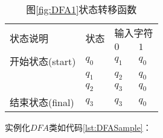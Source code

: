 \begin{table}[!htbp]
    \caption{图{\ref{fig:DFA1}}状态转移函数}
    \label{tab:DFA1}
    \centering
    \small%
    \setlength{\tabcolsep}{4pt}%
    \renewcommand{\arraystretch}{1.2}%
    \begin{tabular}{l p{3em}<{\centering} p{3em}<{\centering} p{3em}<{\centering}}
        \toprule %
        \multirow{2}{*}{状态说明} & \multirow{2}{*}{状态} & \multicolumn{2}{c}{输入字符} \\
		\cline{3-4}      &    &$0$ & $1$  \\
        \midrule%
        开始状态(start)          & $q_0$ & $q_1$  & $q_0$    \\
                                & $q_1$ & $q_2$  & $q_0$    \\
                                & $q_2$ & $q_3$  & $q_0$    \\
        结束状态(final)         & $q_3$ & $q_3$  & $q_0$    \\
        \bottomrule%
    \end{tabular}
\end{table}

实例化$DFA$类如代码\ref{lst:DFASample}：







	
